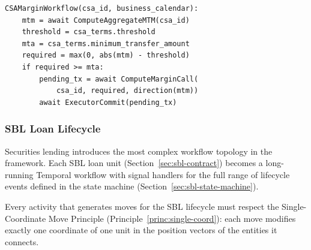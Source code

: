 \documentclass[11pt,a4paper]{article}
\begin{document}
\begin{lstlisting}
CSAMarginWorkflow(csa_id, business_calendar):
    mtm = await ComputeAggregateMTM(csa_id)
    threshold = csa_terms.threshold
    mta = csa_terms.minimum_transfer_amount
    required = max(0, abs(mtm) - threshold)
    if required >= mta:
        pending_tx = await ComputeMarginCall(
            csa_id, required, direction(mtm))
        await ExecutorCommit(pending_tx)
\end{lstlisting}

\subsubsection{SBL Loan Lifecycle}
\label{sec:sbl-lifecycle-workflow}

Securities lending introduces the most complex workflow topology in the framework. Each SBL loan unit (Section~\ref{sec:sbl-contract}) becomes a long-running Temporal workflow with signal handlers for the full range of lifecycle events defined in the state machine (Section~\ref{sec:sbl-state-machine}).

Every activity that generates moves for the SBL lifecycle must respect the Single-Coordinate Move Principle (Principle~\ref{princ:single-coord}): each move modifies exactly one coordinate of one unit in the position vectors of the entities it connects.
\end{document}
